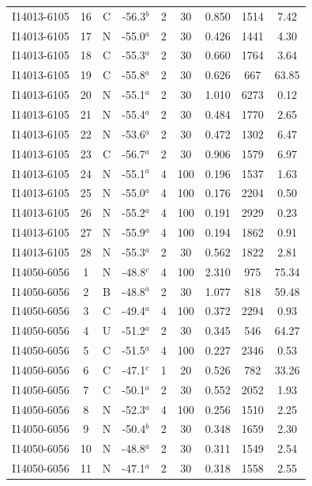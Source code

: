 \begin{table}
\begin{tabular}{ccccccccc}
I14013-6105 & 16 & C & -56.3$^{b}$ & 2 & 30 & 0.850 & 1514 & 7.42 \\
I14013-6105 & 17 & N & -55.0$^{a}$ & 2 & 30 & 0.426 & 1441 & 4.30 \\
I14013-6105 & 18 & C & -55.3$^{a}$ & 2 & 30 & 0.660 & 1764 & 3.64 \\
I14013-6105 & 19 & C & -55.8$^{a}$ & 2 & 30 & 0.626 & 667 & 63.85 \\
I14013-6105 & 20 & N & -55.1$^{a}$ & 2 & 30 & 1.010 & 6273 & 0.12 \\
I14013-6105 & 21 & N & -55.4$^{a}$ & 2 & 30 & 0.484 & 1770 & 2.65 \\
I14013-6105 & 22 & N & -53.6$^{a}$ & 2 & 30 & 0.472 & 1302 & 6.47 \\
I14013-6105 & 23 & C & -56.7$^{a}$ & 2 & 30 & 0.906 & 1579 & 6.97 \\
I14013-6105 & 24 & N & -55.1$^{a}$ & 4 & 100 & 0.196 & 1537 & 1.63 \\
I14013-6105 & 25 & N & -55.0$^{a}$ & 4 & 100 & 0.176 & 2204 & 0.50 \\
I14013-6105 & 26 & N & -55.2$^{a}$ & 4 & 100 & 0.191 & 2929 & 0.23 \\
I14013-6105 & 27 & N & -55.9$^{a}$ & 4 & 100 & 0.194 & 1862 & 0.91 \\
I14013-6105 & 28 & N & -55.3$^{a}$ & 2 & 30 & 0.562 & 1822 & 2.81 \\
I14050-6056 & 1 & N & -48.8$^{c}$ & 4 & 100 & 2.310 & 975 & 75.34 \\
I14050-6056 & 2 & B & -48.8$^{a}$ & 2 & 30 & 1.077 & 818 & 59.48 \\
I14050-6056 & 3 & C & -49.4$^{a}$ & 4 & 100 & 0.372 & 2294 & 0.93 \\
I14050-6056 & 4 & U & -51.2$^{a}$ & 2 & 30 & 0.345 & 546 & 64.27 \\
I14050-6056 & 5 & C & -51.5$^{a}$ & 4 & 100 & 0.227 & 2346 & 0.53 \\
I14050-6056 & 6 & C & -47.1$^{c}$ & 1 & 20 & 0.526 & 782 & 33.26 \\
I14050-6056 & 7 & C & -50.1$^{a}$ & 2 & 30 & 0.552 & 2052 & 1.93 \\
I14050-6056 & 8 & N & -52.3$^{a}$ & 4 & 100 & 0.256 & 1510 & 2.25 \\
I14050-6056 & 9 & N & -50.4$^{b}$ & 2 & 30 & 0.348 & 1659 & 2.30 \\
I14050-6056 & 10 & N & -48.8$^{a}$ & 2 & 30 & 0.311 & 1549 & 2.54 \\
I14050-6056 & 11 & N & -47.1$^{a}$ & 2 & 30 & 0.318 & 1558 & 2.55 \\

\end{tabular}
\end{table}
